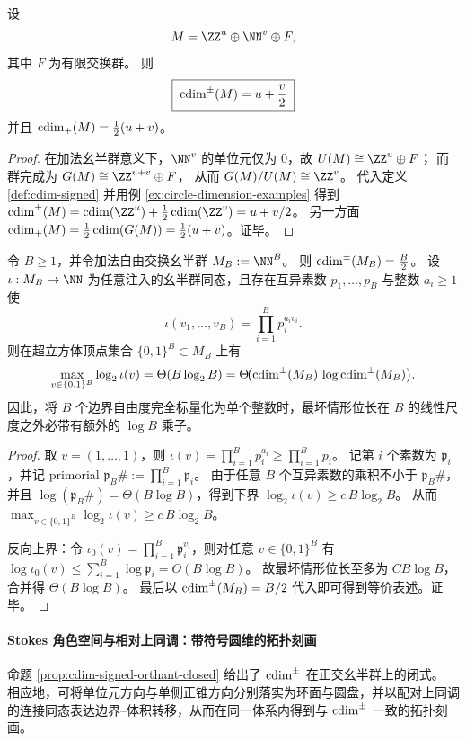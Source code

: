 \begin{proposition}[正交幺半群的闭式计算]\label{prop:cdim-signed-orthant-closed}
设
\[
M=\ZZ^{u}\oplus \NN^{v}\oplus F,
\]
其中 \(F\) 为有限交换群。
则
\[
\boxed{\;\operatorname{cdim}^{\pm}(M)=u+\frac{v}{2}\;}
\]
并且 \(\operatorname{cdim}_{+}(M)=\frac12(u+v)\)。
\end{proposition}
\begin{proof}
在加法幺半群意义下，\(\NN^{v}\) 的单位元仅为 \(0\)，故
\(
U(M)\cong \ZZ^{u}\oplus F
\)；
而群完成为
\(
G(M)\cong \ZZ^{u+v}\oplus F
\)，
从而
\(
G(M)/U(M)\cong \ZZ^{v}
\)。
代入定义 \ref{def:cdim-signed} 并用例 \ref{ex:circle-dimension-examples} 得到
\(
\cdim^{\pm}(M)=\cdim(\ZZ^{u})+\frac12\cdim(\ZZ^{v})=u+v/2
\)。
另一方面 \(\operatorname{cdim}_{+}(M)=\frac12\operatorname{cdim}(G(M))=\frac12(u+v)\)。证毕。
\end{proof}

\begin{proposition}\label{prop:cdim-godel-scalarization-bitlength-logB}
令 \(B\ge 1\)，并令加法自由交换幺半群 \(M_B:=\NN^{B}\)。
则 \(\operatorname{cdim}^{\pm}(M_B)=\frac{B}{2}\)。
设 \(\iota:M_B\to \NN\) 为任意注入的幺半群同态，且存在互异素数 \(p_1,\dots,p_B\) 与整数 \(a_i\ge 1\) 使
\[
\iota(v_1,\dots,v_B)=\prod_{i=1}^{B}p_i^{a_i v_i}.
\]
则在超立方体顶点集合 \(\{0,1\}^{B}\subset M_B\) 上有
\[
\max_{v\in\{0,1\}^B}\log_2\iota(v)=\Theta(B\log_2 B)
=\Theta\!\bigl(\operatorname{cdim}^{\pm}(M_B)\,\log \operatorname{cdim}^{\pm}(M_B)\bigr).
\]
因此，将 \(B\) 个边界自由度完全标量化为单个整数时，最坏情形位长在 \(B\) 的线性尺度之外必带有额外的 \(\log B\) 乘子。
\end{proposition}
\begin{proof}
取 \(v=(1,\dots,1)\)，则
\(
\iota(v)=\prod_{i=1}^{B}p_i^{a_i}\ge \prod_{i=1}^{B}p_i
\)。
记第 \(i\) 个素数为 \(\mathfrak p_i\)，并记 primorial \(\mathfrak p_B\#:=\prod_{i=1}^{B}\mathfrak p_i\)。
由于任意 \(B\) 个互异素数的乘积不小于 \(\mathfrak p_B\#\)，并且 \(\log(\mathfrak p_B\#)=\Theta(B\log B)\)，得到下界
\(
\log_2\iota(v)\ge c\,B\log_2 B
\)。
从而 \(\max_{v\in\{0,1\}^B}\log_2\iota(v)\ge c\,B\log_2 B\)。
\par
反向上界：令 \(\iota_0(v)=\prod_{i=1}^{B}\mathfrak p_i^{v_i}\)，则对任意 \(v\in\{0,1\}^B\) 有
\(
\log \iota_0(v)\le \sum_{i=1}^{B}\log \mathfrak p_i=O(B\log B)
\)。
故最坏情形位长至多为 \(C B\log B\)，合并得 \(\Theta(B\log B)\)。
最后以 \(\operatorname{cdim}^{\pm}(M_B)=B/2\) 代入即可得到等价表述。证毕。
\end{proof}

\paragraph{Stokes 角色空间与相对上同调：带符号圆维的拓扑刻画}\label{para:cdim-signed-stokes-cohomology}
命题 \ref{prop:cdim-signed-orthant-closed} 给出了 \(\operatorname{cdim}^{\pm}\) 在正交幺半群上的闭式。
相应地，可将单位元方向与单侧正锥方向分别落实为环面与圆盘，并以配对上同调的连接同态表达边界--体积转移，从而在同一体系内得到与 \(\operatorname{cdim}^{\pm}\) 一致的拓扑刻画。

